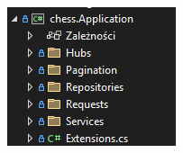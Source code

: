 \documentclass[12pt,a4paper]{article}
\begin{document}
\vspace{1cm}

\begin{minipage}[t]{0.45\textwidth}
    \vspace{0pt}
    \centering
    \includegraphics[width=\linewidth]{zdj/struktura_back_application.png} 
\end{minipage}
\hfill
\begin{minipage}[t]{0.45\textwidth}
    \vspace{0pt}
    \raggedright
    \lipsum[2] 
\end{minipage}

\vspace{1cm}
\end{document}
